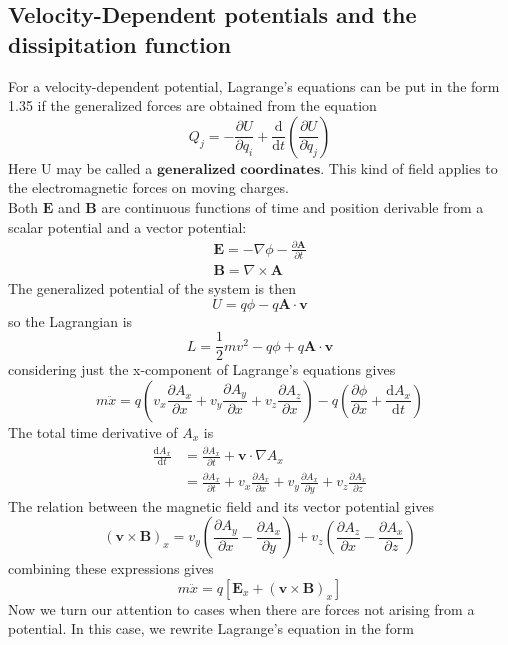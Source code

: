 \documentclass[]{article}
\numberwithin{equation}{section}
\begin{document}
\subsection{Velocity-Dependent potentials and the dissipitation function}
For a velocity-dependent potential, Lagrange's equations can be put in the form 1.35 if the generalized forces are obtained from the equation
\begin{equation}Q_j=-\frac{\partial U}{\partial q_i}+\frac{\mathrm d}{\mathrm dt}\left(\frac{\partial U}{\partial \dot q_j}\right)\end{equation}
Here U may be called a $\textbf{generalized coordinates}$. This kind of field applies to the electromagnetic forces on moving charges.\\
Both $\mathbf E$ and $\mathbf B$ are continuous functions of time and position derivable from a scalar potential and a vector potential:
\begin{align*}
	\mathbf E=-\nabla\phi-\frac{\partial\mathbf A}{\partial t}\\
	\mathbf B=\nabla\times\mathbf A
\end{align*}
The generalized potential of the system is then
$$U=q\phi-q\mathbf{A\cdot v}$$
so the Lagrangian is
$$L=\frac 12mv^2-q\phi+q\mathbf{A\cdot v}$$
considering just the x-component of Lagrange's equations gives
$$m\ddot x=q\left(v_x\frac{\partial A_x}{\partial x}+v_y\frac{\partial A_y}{\partial  x}+v_z\frac{\partial A_z}{\partial x}\right)-q\left(\frac{\partial\phi}{\partial x}+\frac{\mathrm dA_x}{\mathrm dt}\right)$$
The total time derivative of $A_x$ is 
\begin{align*}
	\frac{\mathrm dA_x}{\mathrm dt}&=\frac{\partial A_x}{\partial t}+\mathbf v\cdot\nabla A_x\\
	&=\frac{\partial A_x}{\partial t}+v_x\frac{\partial A_x}{\partial x}+v_y\frac{\partial A_x}{\partial y}+v_z\frac{\partial A_x}{\partial z}
\end{align*}
The relation between the magnetic field and its vector potential gives 
$$(\mathbf{v\times B})_x=v_y\left(\frac{\partial A_y}{\partial x}-\frac{\partial A_x}{\partial y}\right)+v_z\left(\frac{\partial A_z}{\partial x}-\frac{\partial A_x}{\partial z}\right)$$
combining these expressions gives 
\begin{equation}
	m\ddot x=q[\mathbf E_x + (\mathbf v \times \mathbf B)_x]
\end{equation}
Now we turn our attention to cases when there are forces not arising from a potential. In this case, we rewrite Lagrange's equation in the form
\end{document}
